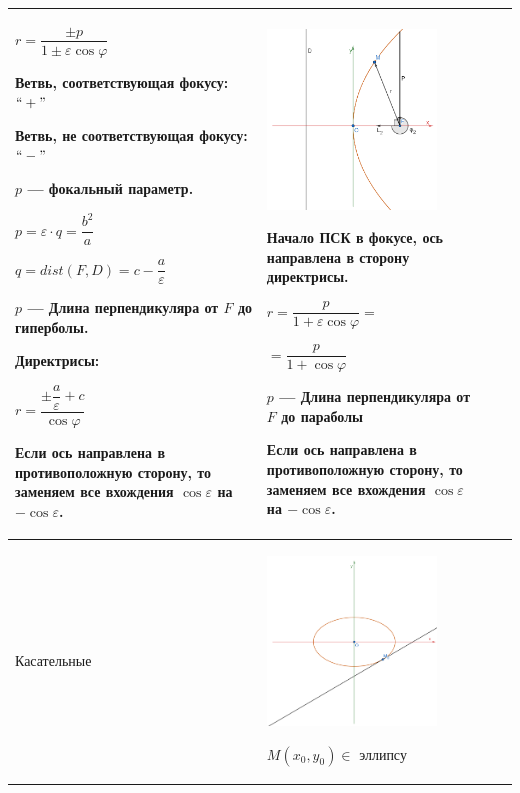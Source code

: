 \documentclass[twoside]{book}
\begin{document}
\begin{center}
\begin{longtable}{|p{2.5cm}|p{4.5cm}|p{4.5cm}|p{4.5cm}|}
        \(r = \dfrac{\pm p}{1 \pm \varepsilon \cos\varphi}\)

        Ветвь, соответствующая фокусу: \(``+"\)

        Ветвь, не соответствующая фокусу: \(``-"\)

        \(p\) --- фокальный параметр.

        \(p = \varepsilon \cdot q = \dfrac{b^2}{a}\)

        \(q = dist(F, D) = c - \dfrac{a}{\varepsilon}\)

        \(p\) --- Длина перпендикуляра от \(F\) до гиперболы.

        Директрисы:

        \(r = \dfrac{\pm \dfrac{a}{\varepsilon} + c}{\cos\varphi}\)

        Если ось направлена в противоположную сторону, то заменяем все вхождения $\cos{\varepsilon}$ на $-\cos{\varepsilon}$.

         &
        \begin{center}
            \includegraphics[width=4.5cm]{Images/Chapter_1/3-1-12.png}
        \end{center}
        Начало ПСК в фокусе, ось направлена в сторону директрисы.

        \(r = \dfrac{p}{1 + \varepsilon \cos\varphi} = \)

        \(= \dfrac{p}{1 + \cos\varphi}\)

        \(p\) --- Длина перпендикуляра от \(F\) до параболы

        Если ось направлена в противоположную сторону, то заменяем все вхождения $\cos{\varepsilon}$ на $-\cos{\varepsilon}$.
        \\
        \hline
        Касательные
         &
        \begin{center}
            \includegraphics[width=4.5cm]{Images/Chapter_1/3-1-13.png}
        \end{center}
        \(M(x_0, y_0) \in\) эллипсу


\end{longtable}
\end{center}
\end{document}
